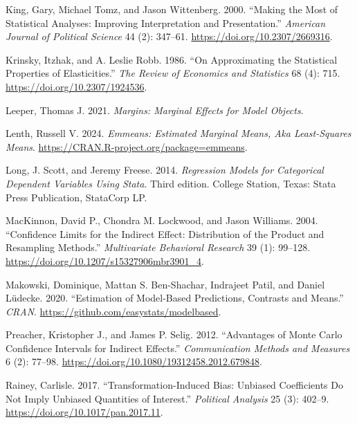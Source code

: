 \begin{CSLReferences}{1}{0}
\leavevmode{}%
King, Gary, Michael Tomz, and Jason Wittenberg. 2000. {``Making the Most of Statistical Analyses: Improving Interpretation and Presentation.''} \emph{American Journal of Political Science} 44 (2): 347--61. \url{https://doi.org/10.2307/2669316}.

\leavevmode{}%
Krinsky, Itzhak, and A. Leslie Robb. 1986. {``On Approximating the Statistical Properties of Elasticities.''} \emph{The Review of Economics and Statistics} 68 (4): 715. \url{https://doi.org/10.2307/1924536}.

\leavevmode{}%
Leeper, Thomas J. 2021. \emph{Margins: Marginal Effects for Model Objects}.

\leavevmode{}%
Lenth, Russell V. 2024. \emph{Emmeans: Estimated Marginal Means, Aka Least-Squares Means}. \url{https://CRAN.R-project.org/package=emmeans}.

\leavevmode{}%
Long, J. Scott, and Jeremy Freese. 2014. \emph{Regression Models for Categorical Dependent Variables Using Stata}. Third edition. College Station, Texas: Stata Press Publication, StataCorp LP.

\leavevmode{}%
MacKinnon, David P., Chondra M. Lockwood, and Jason Williams. 2004. {``Confidence Limits for the Indirect Effect: Distribution of the Product and Resampling Methods.''} \emph{Multivariate Behavioral Research} 39 (1): 99--128. \url{https://doi.org/10.1207/s15327906mbr3901_4}.

\leavevmode{}%
Makowski, Dominique, Mattan S. Ben-Shachar, Indrajeet Patil, and Daniel Lüdecke. 2020. {``Estimation of Model-Based Predictions, Contrasts and Means.''} \emph{CRAN}. \url{https://github.com/easystats/modelbased}.

\leavevmode{}%
Preacher, Kristopher J., and James P. Selig. 2012. {``Advantages of Monte Carlo Confidence Intervals for Indirect Effects.''} \emph{Communication Methods and Measures} 6 (2): 77--98. \url{https://doi.org/10.1080/19312458.2012.679848}.

\leavevmode{}%
Rainey, Carlisle. 2017. {``Transformation-Induced Bias: Unbiased Coefficients Do Not Imply Unbiased Quantities of Interest.''} \emph{Political Analysis} 25 (3): 402--9. \url{https://doi.org/10.1017/pan.2017.11}.


\end{CSLReferences}
